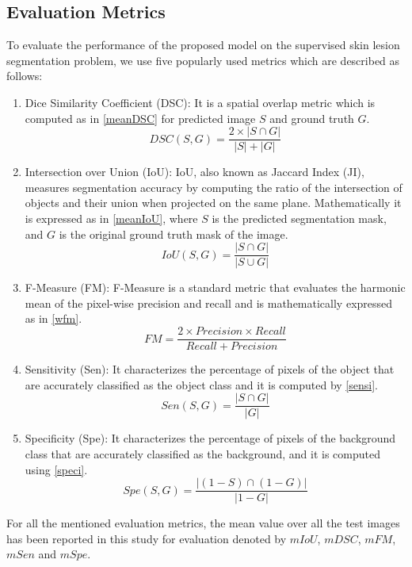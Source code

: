\documentclass[review]{elsarticle}
\begin{document}
\subsection{Evaluation Metrics}\label{experiment}
To evaluate the performance of the proposed model on the supervised skin lesion segmentation problem, we use five popularly used metrics which are described as follows:

\begin{enumerate}
    
    \item Dice Similarity Coefficient (DSC): It is a spatial overlap metric which is computed as in \autoref{meanDSC} for predicted image $S$ and ground truth $G$. 
    \begin{equation}\label{meanDSC}
        DSC(S,G)=\frac{2\times |S\cap G|}{|S|+|G|}
    \end{equation}
    
    
    \item Intersection over Union (IoU): IoU, also known as Jaccard Index (JI), measures segmentation accuracy by computing the ratio of the intersection of objects and their union when projected on the same plane. Mathematically it is expressed as in \autoref{meanIoU}, where $S$ is the predicted segmentation mask, and $G$ is the original ground truth mask of the image.
    \begin{equation}\label{meanIoU}
        IoU(S,G)=\frac{|S\cap G|}{|S\cup G|}
    \end{equation}
    
    \item F-Measure (FM): F-Measure is a standard metric that evaluates the harmonic mean of the pixel-wise precision and recall and is mathematically expressed as in \autoref{wfm}.
    \begin{equation}\label{wfm}
        FM=\frac{2\times Precision\times Recall}{Recall+Precision}
    \end{equation}
    
    \item  Sensitivity (Sen): It characterizes the percentage of pixels of the object that are accurately classified as the object class and it is computed by \autoref{sensi}.
    \begin{equation}\label{sensi}
        Sen(S,G)=\frac{|S\cap G|}{|G|}
\end{equation}
    
    \item Specificity (Spe): It characterizes the percentage of pixels of the background class that are accurately classified as the background, and it is computed using \autoref{speci}.
    \begin{equation}\label{speci}
        Spe(S,G)=\frac{|(1-S)\cap(1-G)|}{|1-G|}
\end{equation}
    
\end{enumerate}
For all the mentioned evaluation metrics, the mean value over all the test images has been reported in this study for evaluation denoted by $mIoU$, $mDSC$, $mFM$, $mSen$ and $mSpe$.
\end{document}
